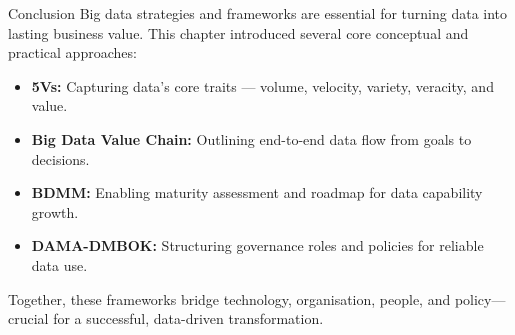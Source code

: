 \documentclass[aspectratio=169, table]{beamer}
\begin{document}
	\begin{frame}[fragile]{Conclusion}
		\small
		Big data strategies and frameworks are essential for turning data into lasting business value. This chapter introduced several core conceptual and practical approaches:
		
		\vspace{6pt}
		\begin{itemize}
			\item \textbf{5Vs:} Capturing data's core traits — volume, velocity, variety, veracity, and value.
			\item \textbf{Big Data Value Chain:} Outlining end-to-end data flow from goals to decisions.
			\item \textbf{BDMM:} Enabling maturity assessment and roadmap for data capability growth.
			\item \textbf{DAMA-DMBOK:} Structuring governance roles and policies for reliable data use.
		\end{itemize}
		
		\vspace{6pt}
		Together, these frameworks bridge technology, organisation, people, and policy—crucial for a successful, data-driven transformation.
	\end{frame}
	
	
	
	
\end{document}
